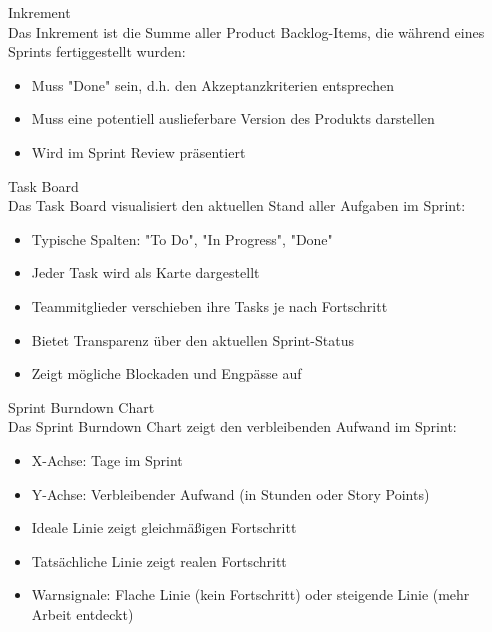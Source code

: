 \begin{definition}{Inkrement}\\
    Das Inkrement ist die Summe aller Product Backlog-Items, die während eines Sprints fertiggestellt wurden:
    \begin{itemize}
        \item Muss "Done" sein, d.h. den Akzeptanzkriterien entsprechen
        \item Muss eine potentiell auslieferbare Version des Produkts darstellen
        \item Wird im Sprint Review präsentiert
    \end{itemize}
\end{definition}

\begin{concept}{Task Board}\\
    Das Task Board visualisiert den aktuellen Stand aller Aufgaben im Sprint:
    \begin{itemize}
        \item Typische Spalten: "To Do", "In Progress", "Done"
        \item Jeder Task wird als Karte dargestellt
        \item Teammitglieder verschieben ihre Tasks je nach Fortschritt
        \item Bietet Transparenz über den aktuellen Sprint-Status
        \item Zeigt mögliche Blockaden und Engpässe auf
    \end{itemize}
\end{concept}

\begin{concept}{Sprint Burndown Chart}\\
    Das Sprint Burndown Chart zeigt den verbleibenden Aufwand im Sprint:
    \begin{itemize}
        \item X-Achse: Tage im Sprint
        \item Y-Achse: Verbleibender Aufwand (in Stunden oder Story Points)
        \item Ideale Linie zeigt gleichmäßigen Fortschritt
        \item Tatsächliche Linie zeigt realen Fortschritt
        \item Warnsignale: Flache Linie (kein Fortschritt) oder steigende Linie (mehr Arbeit entdeckt)
    \end{itemize}
\end{concept}

